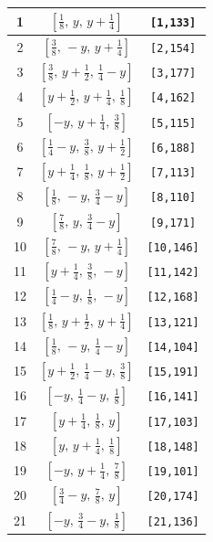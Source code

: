 \documentclass[fleqn,8pt]{jsarticle}
\begin{document}
\begin{longtable}{ccc}
1 & $\left[ \frac{1}{8},\, y,\, y + \frac{1}{4} \right]$ & {\tt [1,133]} \\ \hline
2 & $\left[ \frac{3}{8},\, - y,\, y + \frac{1}{4} \right]$ & {\tt [2,154]} \\ \hline
3 & $\left[ \frac{3}{8},\, y + \frac{1}{2},\, \frac{1}{4} - y \right]$ & {\tt [3,177]} \\ \hline
4 & $\left[ y + \frac{1}{2},\, y + \frac{1}{4},\, \frac{1}{8} \right]$ & {\tt [4,162]} \\ \hline
5 & $\left[ - y,\, y + \frac{1}{4},\, \frac{3}{8} \right]$ & {\tt [5,115]} \\ \hline
6 & $\left[ \frac{1}{4} - y,\, \frac{3}{8},\, y + \frac{1}{2} \right]$ & {\tt [6,188]} \\ \hline
7 & $\left[ y + \frac{1}{4},\, \frac{1}{8},\, y + \frac{1}{2} \right]$ & {\tt [7,113]} \\ \hline
8 & $\left[ \frac{1}{8},\, - y,\, \frac{3}{4} - y \right]$ & {\tt [8,110]} \\ \hline
9 & $\left[ \frac{7}{8},\, y,\, \frac{3}{4} - y \right]$ & {\tt [9,171]} \\ \hline
10 & $\left[ \frac{7}{8},\, - y,\, y + \frac{1}{4} \right]$ & {\tt [10,146]} \\ \hline
11 & $\left[ y + \frac{1}{4},\, \frac{3}{8},\, - y \right]$ & {\tt [11,142]} \\ \hline
12 & $\left[ \frac{1}{4} - y,\, \frac{1}{8},\, - y \right]$ & {\tt [12,168]} \\ \hline
13 & $\left[ \frac{1}{8},\, y + \frac{1}{2},\, y + \frac{1}{4} \right]$ & {\tt [13,121]} \\ \hline
14 & $\left[ \frac{1}{8},\, - y,\, \frac{1}{4} - y \right]$ & {\tt [14,104]} \\ \hline
15 & $\left[ y + \frac{1}{2},\, \frac{1}{4} - y,\, \frac{3}{8} \right]$ & {\tt [15,191]} \\ \hline
16 & $\left[ - y,\, \frac{1}{4} - y,\, \frac{1}{8} \right]$ & {\tt [16,141]} \\ \hline
17 & $\left[ y + \frac{1}{4},\, \frac{1}{8},\, y \right]$ & {\tt [17,103]} \\ \hline
18 & $\left[ y,\, y + \frac{1}{4},\, \frac{1}{8} \right]$ & {\tt [18,148]} \\ \hline
19 & $\left[ - y,\, y + \frac{1}{4},\, \frac{7}{8} \right]$ & {\tt [19,101]} \\ \hline
20 & $\left[ \frac{3}{4} - y,\, \frac{7}{8},\, y \right]$ & {\tt [20,174]} \\ \hline
21 & $\left[ - y,\, \frac{3}{4} - y,\, \frac{1}{8} \right]$ & {\tt [21,136]} \\ \hline

\end{longtable}
\end{document}
